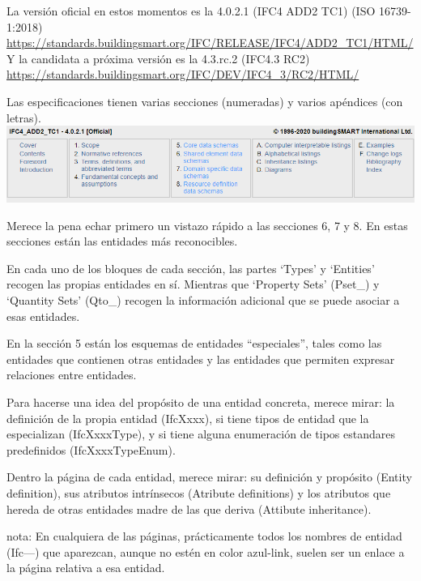 \documentclass[spanish,12pt,a4paper,final,oneside]{book}
\begin{document}
La versión oficial en estos momentos es la 4.0.2.1 (IFC4 ADD2 TC1) (ISO 16739-1:2018) 
\\ \url{https://standards.buildingsmart.org/IFC/RELEASE/IFC4/ADD2_TC1/HTML/}
\\Y la candidata a próxima versión es la 4.3.rc.2 (IFC4.3 RC2)
\\ \url{https://standards.buildingsmart.org/IFC/DEV/IFC4_3/RC2/HTML/}

Las especificaciones tienen varias secciones (numeradas) y varios apéndices (con letras).
\\ \includegraphics[width=\textwidth]{cabecera de las especificaciones}

Merece la pena echar primero un vistazo rápido a las secciones 6, 7 y 8. En estas secciones están las entidades más reconocibles.

En cada uno de los bloques de cada sección, las partes `Types' y `Entities' recogen las propias entidades en sí. Mientras que `Property Sets' (Pset\_) y `Quantity Sets' (Qto\_) recogen la información adicional que se puede asociar a esas entidades.

En la sección 5 están los esquemas de entidades ``especiales'', tales como las entidades que contienen otras entidades y las entidades que permiten expresar relaciones entre entidades.

\vspace{0.5cm}

Para hacerse una idea del propósito de una entidad concreta, merece mirar: la definición de la propia entidad (IfcXxxx), si tiene tipos de entidad que la especializan (IfcXxxxType), y si tiene alguna enumeración de tipos estandares predefinidos (IfcXxxxTypeEnum).

Dentro la página de cada entidad, merece mirar: su definición y propósito (Entity definition), sus atributos intrínsecos (Atribute definitions) y los atributos que hereda de otras entidades madre de las que deriva (Attibute inheritance).

\vspace{0.5cm}

nota: En cualquiera de las páginas, prácticamente todos los nombres de entidad (Ifc---) que aparezcan, aunque no estén en color azul-link, suelen ser un enlace a la página relativa a esa entidad. 
\end{document}
